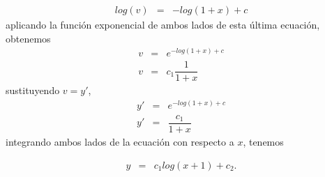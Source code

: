 \documentclass[11pt,letterpaper]{article}
\theoremstyle{definition}
\theoremstyle{definition}
\theoremstyle{definition}
\begin{document}
\begin{itemize}
\begin{eqnarray*}
		log(v) & = & - log(1+x)  + c
	\end{eqnarray*}
	aplicando la función exponencial de ambos lados de esta última ecuación, obtenemos
	\begin{eqnarray*}
		v & = & e^{- log(1+x) + c} \\
		v & = & c_1 \dfrac{1}{1+x}
	\end{eqnarray*}
	sustituyendo $ v = y' $,
	\begin{eqnarray*}
		y' & = & e^{- log(1+x) + c} \\
		y' & = & \dfrac{c_1}{1+x}
	\end{eqnarray*}
	integrando ambos lados de la ecuación con respecto a $ x $, tenemos
	\begin{shaded*}
	\begin{eqnarray*}
		y  & = &  c_1 log(x+1) + c_2.
	\end{eqnarray*}
	\end{shaded*}
\end{itemize}
\end{document}
